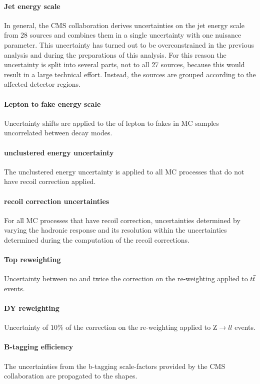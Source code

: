\paragraph{Jet energy scale} In general, the CMS collaboration derives uncertainties on the jet energy scale from 28 sources and combines them in a single uncertainty with one nuisance parameter. This uncertainty has turned out to be overconstrained in the previous analysis and during the preparations of this analysis. For this reason the uncertainty is split into several parts, not to all 27 sources, because this would result in a large technical effort. Instead, the sources are grouped according to the affected detector regions.

\paragraph{Lepton to \tauh fake energy scale} Uncertainty shifts are applied to the \pt of lepton to \tauh fakes in MC samples uncorrelated between decay modes.

\paragraph{\met unclustered energy uncertainty} The \met unclustered energy uncertainty is applied to all MC processes that do not have recoil correction applied.

\paragraph{\met recoil correction uncertainties} For all MC processes that have recoil correction, uncertainties determined by varying the hadronic response and its resolution within the uncertainties determined during the computation of the recoil corrections.

\paragraph{Top \pt reweighting} Uncertainty between no and twice the correction on the re-weighting applied to $t\Bar{t}$ events.

\paragraph{DY \pt reweighting} Uncertainty of $10\%$ of the correction on the re-weighting applied to $\mathrm{Z}\rightarrow ll$ events.

\paragraph{B-tagging efficiency} The uncertainties from the b-tagging scale-factors provided by the CMS collaboration are propagated to the shapes.

